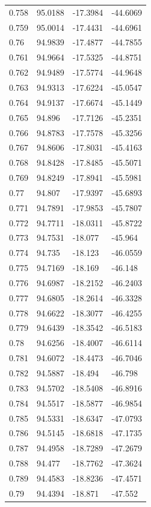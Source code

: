 \begin{tabular}{llll}
0.758 & 95.0188 & -17.3984 & -44.6069 \\
0.759 & 95.0014 & -17.4431 & -44.6961 \\
0.76 & 94.9839 & -17.4877 & -44.7855 \\
0.761 & 94.9664 & -17.5325 & -44.8751 \\
0.762 & 94.9489 & -17.5774 & -44.9648 \\
0.763 & 94.9313 & -17.6224 & -45.0547 \\
0.764 & 94.9137 & -17.6674 & -45.1449 \\
0.765 & 94.896 & -17.7126 & -45.2351 \\
0.766 & 94.8783 & -17.7578 & -45.3256 \\
0.767 & 94.8606 & -17.8031 & -45.4163 \\
0.768 & 94.8428 & -17.8485 & -45.5071 \\
0.769 & 94.8249 & -17.8941 & -45.5981 \\
0.77 & 94.807 & -17.9397 & -45.6893 \\
0.771 & 94.7891 & -17.9853 & -45.7807 \\
0.772 & 94.7711 & -18.0311 & -45.8722 \\
0.773 & 94.7531 & -18.077 & -45.964 \\
0.774 & 94.735 & -18.123 & -46.0559 \\
0.775 & 94.7169 & -18.169 & -46.148 \\
0.776 & 94.6987 & -18.2152 & -46.2403 \\
0.777 & 94.6805 & -18.2614 & -46.3328 \\
0.778 & 94.6622 & -18.3077 & -46.4255 \\
0.779 & 94.6439 & -18.3542 & -46.5183 \\
0.78 & 94.6256 & -18.4007 & -46.6114 \\
0.781 & 94.6072 & -18.4473 & -46.7046 \\
0.782 & 94.5887 & -18.494 & -46.798 \\
0.783 & 94.5702 & -18.5408 & -46.8916 \\
0.784 & 94.5517 & -18.5877 & -46.9854 \\
0.785 & 94.5331 & -18.6347 & -47.0793 \\
0.786 & 94.5145 & -18.6818 & -47.1735 \\
0.787 & 94.4958 & -18.7289 & -47.2679 \\
0.788 & 94.477 & -18.7762 & -47.3624 \\
0.789 & 94.4583 & -18.8236 & -47.4571 \\
0.79 & 94.4394 & -18.871 & -47.552 \\

\end{tabular}

